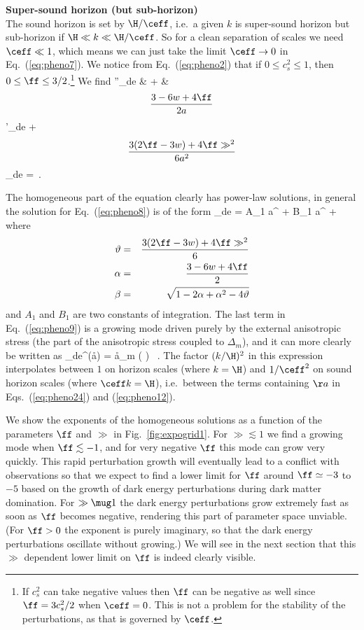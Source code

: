 \noindent\textbf{Super-sound horizon (but sub-horizon)}\\

The sound horizon is set by $\H/\ceff$, i.e.\ a given $k$ is super-sound horizon but sub-horizon if $\H\ll k\ll \H/\ceff$. So for a clean separation of scales we need $\ceff \ll 1$, which means we can just take the limit $\ceff\to 0$  in Eq.\ (\ref{eq:pheno7}). We notice from Eq.\ (\ref{eq:pheno2}) that if $ 0\leq c_s^2 \leq 1 $, then $ 0 \leq \ff \leq 3/2 $.\footnote{If $c_s^2$ can take negative values then $ \ff $ can be negative as well since $ \ff = 3c_s^2/2 $ when $\ceff = 0$. This is not a problem for the stability of the perturbations, as that is governed by $\ceff$.} We find
\be 
\delta''_{de} & + & \[ \frac{3 - 6 w + 4 \ff}{2 a} \] \delta'_{de} + \[ \frac{3 (2 \ff - 3 w)  + 4 \ff \gg^2 }{6 a^2}  \] \delta_{de}  = \,. 
\label{eq:pheno8}
\ee

The homogeneous part of the equation clearly has power-law solutions, in general the solution for Eq.\ (\ref{eq:pheno8}) is of the form
\be 
\delta_{de} = A_1 a^{} + B_1 a^{} +  
\label{eq:pheno9}
\ee
where 
\begin{eqnarray}
\vartheta & = & \frac{3 (2 \ff - 3 w)  + 4 \ff \gg^2 }{6}   \\
\alpha & = & \frac{3 - 6 w + 4 \ff}{2}\\ 
\beta & = &  \sqrt{1-2\alpha + \alpha^2 -4 \vartheta }
\label{eq:pheno10}
\end{eqnarray}
and $ A_1 $ and $ B_1 $ are two constants of integration. The last term in Eq.\ (\ref{eq:pheno9}) is a growing mode driven purely by the external anisotropic stress (the part of the anisotropic stress coupled to $\Delta_m$), and it can more clearly be written as
\be
\delta_{de}^{(\aa)} = 
\aa \delta_m \left( \right)  \, .
\ee
The factor $(k/\H)^2$ in this expression interpolates between $1$ on horizon scales (where $k=\H$) and $1/\ceff^2$ on sound horizon scales (where $\ceff k = \H$), i.e.\ between the terms containing $\aa$ in Eqs.\ (\ref{eq:pheno24}) and (\ref{eq:pheno12}).

We show the exponents of the homogeneous solutions as a function of the parameters $\ff$ and $\gg$ in Fig.\ \ref{fig:expogrid1}. For $\gg \lesssim 1$ we find a growing mode when $\ff \lesssim -1$, and for very negative $\ff$ this mode can grow very quickly. This rapid perturbation growth will eventually lead to a conflict with observations so that we expect to find a lower limit for $\ff$ around $\ff \simeq -3$ to $-5$ based on the growth of dark energy perturbations during dark matter domination. For $\gg \mug 1$ the dark energy perturbations grow extremely fast as soon as $\ff$ becomes negative, rendering this part of parameter space unviable. (For $\ff>0$ the exponent is purely imaginary, so that the dark energy perturbations oscillate without growing.) We will see in the next section that this $\gg$ dependent lower limit on $\ff$ is indeed clearly visible.

